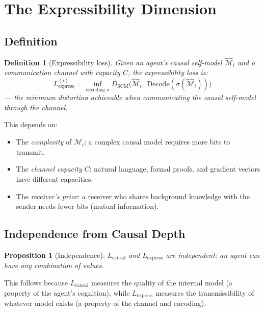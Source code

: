 \documentclass[11pt,a4paper]{article}
\newtheorem{proposition}[theorem]{Proposition}
\newtheorem{definition}[theorem]{Definition}
\begin{document}
\section{The Expressibility Dimension}

\subsection{Definition}

\begin{definition}[Expressibility loss]\label{def:L-express}
Given an agent's causal self-model $\hat{\mathcal{M}}_i$ and a
communication channel with capacity $C$, the expressibility loss is:
\begin{equation}\label{eq:L-express}
    L_{\text{express}}^{(i)} = \inf_{\text{encoding } \sigma}
    D_{\text{SCM}}\bigl(\hat{\mathcal{M}}_i,\;
    \text{Decode}(\sigma(\hat{\mathcal{M}}_i))\bigr)
\end{equation}
--- the minimum distortion achievable when communicating the causal
self-model through the channel.
\end{definition}

This depends on:
\begin{itemize}
    \item The \emph{complexity} of $\hat{\mathcal{M}}_i$: a complex
    causal model requires more bits to transmit.
    \item The \emph{channel capacity} $C$: natural language, formal
    proofs, and gradient vectors have different capacities.
    \item The \emph{receiver's prior}: a receiver who shares background
    knowledge with the sender needs fewer bits (mutual information).
\end{itemize}


\subsection{Independence from Causal Depth}

\begin{proposition}[Independence]\label{prop:independence}
$L_{\text{causal}}$ and $L_{\text{express}}$ are independent:
an agent can have any combination of values.
\end{proposition}

This follows because $L_{\text{causal}}$ measures the quality of the
internal model (a property of the agent's cognition), while
$L_{\text{express}}$ measures the transmissibility of whatever
model exists (a property of the channel and encoding).
\end{document}
